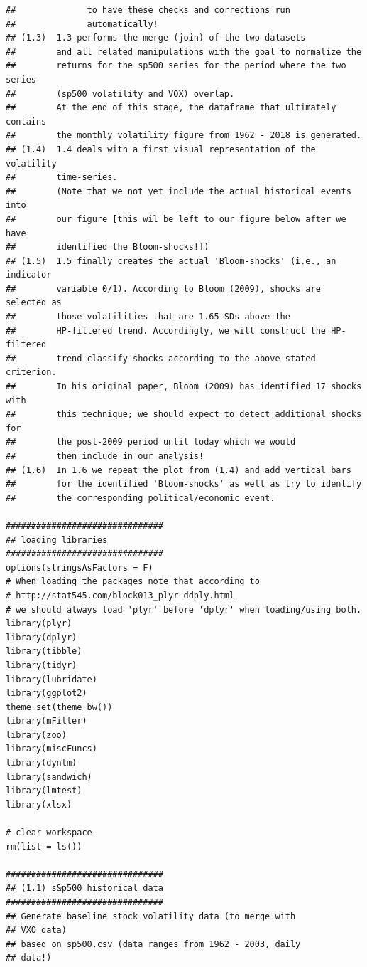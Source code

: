 \documentclass[a4paper,12pt,oneside,pointednumbers,bibtotoc,bigheadings,liststotoc]{scrbook}
\begin{document}
\begin{verbatim}
##              to have these checks and corrections run 
##              automatically!
## (1.3)  1.3 performs the merge (join) of the two datasets
##        and all related manipulations with the goal to normalize the 
##        returns for the sp500 series for the period where the two series
##        (sp500 volatility and VOX) overlap.
##        At the end of this stage, the dataframe that ultimately contains
##        the monthly volatility figure from 1962 - 2018 is generated.
## (1.4)  1.4 deals with a first visual representation of the volatility 
##        time-series.
##        (Note that we not yet include the actual historical events into
##        our figure [this wil be left to our figure below after we have
##        identified the Bloom-shocks!])
## (1.5)  1.5 finally creates the actual 'Bloom-shocks' (i.e., an indicator
##        variable 0/1). According to Bloom (2009), shocks are selected as
##        those volatilities that are 1.65 SDs above the
##        HP-filtered trend. Accordingly, we will construct the HP-filtered
##        trend classify shocks according to the above stated criterion.
##        In his original paper, Bloom (2009) has identified 17 shocks with
##        this technique; we should expect to detect additional shocks for
##        the post-2009 period until today which we would
##        then include in our analysis!
## (1.6)  In 1.6 we repeat the plot from (1.4) and add vertical bars
##        for the identified 'Bloom-shocks' as well as try to identify 
##        the corresponding political/economic event.

###############################
## loading libraries
###############################
options(stringsAsFactors = F)
# When loading the packages note that according to
# http://stat545.com/block013_plyr-ddply.html
# we should always load 'plyr' before 'dplyr' when loading/using both.
library(plyr)
library(dplyr)
library(tibble)
library(tidyr)
library(lubridate)
library(ggplot2)
theme_set(theme_bw())
library(mFilter)
library(zoo)
library(miscFuncs)
library(dynlm)
library(sandwich)
library(lmtest)
library(xlsx)

# clear workspace
rm(list = ls())

###############################
## (1.1) s&p500 historical data
###############################
## Generate baseline stock volatility data (to merge with
## VXO data)
## based on sp500.csv (data ranges from 1962 - 2003, daily
## data!)


\end{verbatim}
\end{document}
